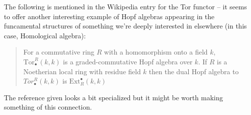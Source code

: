 \documentclass[article]{article}
\begin{document}
The following is mentioned in the Wikipedia entry for the Tor functor -- it seems to offer another interesting example of Hopf algebras appearing in the funcamental structures of something we're deeply interested in elsewhere (in this case, Homological algebra):
\begin{quote}
	For a commutative ring $R$ with a homomorphism onto a field $k$, $\text{Tor}_\bullet^R(k, k)$ is a graded-commutative Hopf algebra over $k$. If $R$ is a Noetherian local ring with residue field $k$ then the dual Hopf algebra to $Tor_\bullet^R(k,k)$ is $\text{Ext}^\bullet_R(k, k)$
\end{quote}
The reference given looks a bit specialized but it might be worth making something of this connection.
\end{document}
